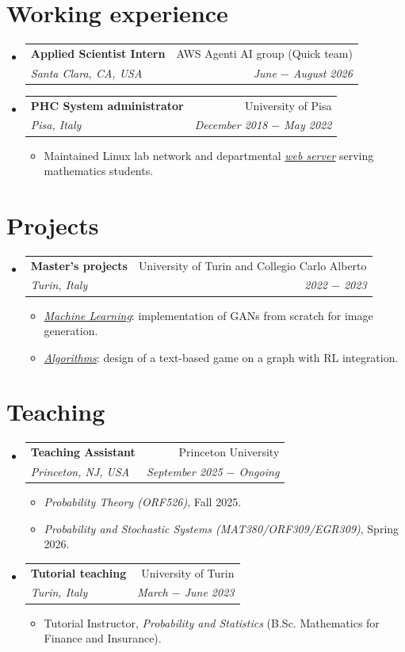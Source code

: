 \documentclass[a4paper, 11pt]{article}
\makeatletter
\newcommand{\cvitemstart}{\begin{itemize}}
\newcommand{\cvitemend}{\end{itemize}\vspace{-5pt}}
\newcommand{\cvitem}[1]{%
			\item \small{{#1 \vspace{-1pt}}}
		}
\newcommand{\cvsubheadingstart}{%
			\begin{itemize}[leftmargin = 0cm, label = {}]
		}
\newcommand{\cvsubheadingend}{\end{itemize}}
\newcommand{\cvsubheading}[4]{
			\vspace{-4pt}
			\item
				\begin{tabular*}{\textwidth}[t]{l@{\extracolsep{\fill}}r}
					\textbf{#1} & #2 \\
					\textit{\small #3} & \textit{\small #4} \\
				\end{tabular*}\vspace{-7pt}
		}
\makeatother
\begin{document}
	\section{Working experience}
		\cvsubheadingstart
			\cvsubheading{Applied Scientist Intern}%
				{AWS Agenti AI group (Quick team)}%
				{Santa Clara, CA, USA}%
				{June $-$ August 2026}
			\vspace{2pt}
			\cvsubheading{PHC System administrator}%
				{University of Pisa}%
				{Pisa, Italy}%
				{December 2018 $-$ May 2022}
				\cvitemstart
					\cvitem{Maintained Linux lab network and departmental \href{http://poisson.phc.dm.unipi.it}{\textit{web server}} serving mathematics students.}
				\cvitemend
		\cvsubheadingend
		\vspace{-16pt}

	\section{Projects}
		\cvsubheadingstart
			\cvsubheading{Master's projects}%
				{University of Turin and Collegio Carlo Alberto}%
				{Turin, Italy}%
				{2022 $-$ 2023}
				\cvitemstart
					\cvitem{\href{https://github.com/caporali/machine_learning_project}{\textit{Machine Learning}}: implementation of GANs from scratch for image generation.}
					\cvitem{\href{https://github.com/caporali/keep_heading_north}{\textit{Algorithms}}: design of a text-based game on a graph with RL integration.}
				\cvitemend
		\cvsubheadingend
		\vspace{-16pt}

	\section{Teaching}
		\cvsubheadingstart
			\cvsubheading{Teaching Assistant}%
				{Princeton University}%
				{Princeton, NJ, USA}%
				{September 2025 $-$ Ongoing}
				\cvitemstart
					\cvitem{\textit{Probability Theory (ORF526)}, Fall 2025.} 
					\cvitem{\textit{Probability and Stochastic Systems (MAT380/ORF309/EGR309)}, Spring 2026.} 
				\cvitemend
			\vspace{2pt}
			\cvsubheading{Tutorial teaching}%
				{University of Turin}%
				{Turin, Italy}%
				{March $-$ June 2023}
				\cvitemstart
					\cvitem{Tutorial Instructor, \textit{Probability and Statistics} (B.Sc. Mathematics for Finance and Insurance).} 
				\cvitemend
		\cvsubheadingend
		\vspace{-16pt}
\end{document}
